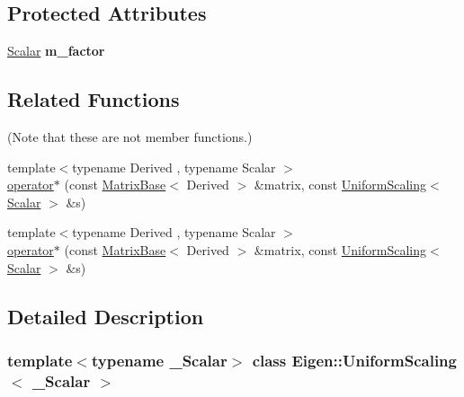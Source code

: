 \subsection*{Protected Attributes}
\begin{DoxyCompactItemize}
\item 
\mbox{\label{class_eigen_1_1_uniform_scaling_a6f473538d51d9d2966077a11acd2c071}} 
\hyperlink{class_eigen_1_1_uniform_scaling_a04c4339f58f1210c5d4d34b1bd7ae283}{Scalar} {\bfseries m\+\_\+factor}
\end{DoxyCompactItemize}
\subsection*{Related Functions}
(Note that these are not member functions.) \begin{DoxyCompactItemize}
\item 
{\footnotesize template$<$typename Derived , typename Scalar $>$ }\\\hyperlink{group___geometry___module_ga8f79e131479dbe709ee1173b1be9a8f0}{operator$\ast$} (const \hyperlink{group___core___module_class_eigen_1_1_matrix_base}{Matrix\+Base}$<$ Derived $>$ \&matrix, const \hyperlink{class_eigen_1_1_uniform_scaling}{Uniform\+Scaling}$<$ \hyperlink{class_eigen_1_1_uniform_scaling_a04c4339f58f1210c5d4d34b1bd7ae283}{Scalar} $>$ \&s)
\item 
{\footnotesize template$<$typename Derived , typename Scalar $>$ }\\\hyperlink{class_eigen_1_1_uniform_scaling_ga8f79e131479dbe709ee1173b1be9a8f0}{operator$\ast$} (const \hyperlink{group___core___module_class_eigen_1_1_matrix_base}{Matrix\+Base}$<$ Derived $>$ \&matrix, const \hyperlink{class_eigen_1_1_uniform_scaling}{Uniform\+Scaling}$<$ \hyperlink{class_eigen_1_1_uniform_scaling_a04c4339f58f1210c5d4d34b1bd7ae283}{Scalar} $>$ \&s)
\end{DoxyCompactItemize}


\subsection{Detailed Description}
\subsubsection*{template$<$typename \+\_\+\+Scalar$>$\newline
class Eigen\+::\+Uniform\+Scaling$<$ \+\_\+\+Scalar $>$}



